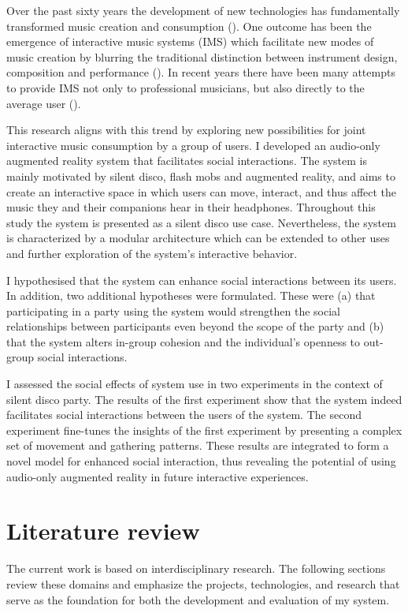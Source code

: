 \documentclass[a4paper,11pt]{article}
\begin{document}
Over the past sixty years the development of new technologies has fundamentally transformed music creation and consumption (\cite{hargreaves99}).
One outcome has been the emergence of interactive music systems (IMS) which facilitate new modes of music creation by blurring the traditional distinction between instrument design, composition and performance (\cite{drummond09}).
In recent years there have been many attempts to provide IMS not only to professional musicians, but also directly to the average user (\cite{stimulant13}).

This research aligns with this trend by exploring new possibilities for joint interactive music consumption by a group of users.
I developed an audio-only augmented reality system that facilitates social interactions.
The system is mainly motivated by silent disco, flash mobs and augmented reality, and aims to create an interactive space in which users can move, interact, and thus affect the music they and their companions hear in their headphones.
Throughout this study the system is presented as a silent disco use case.
Nevertheless, the system is characterized by a modular architecture which can be extended to other uses and further exploration of the system's interactive behavior.

I hypothesised that the system can enhance social interactions between its users.
In addition, two additional hypotheses were formulated.
These were (a) that participating in a party using the system would strengthen the social relationships between participants even beyond the scope of the party and (b) that the system alters in-group cohesion and the individual's openness to out-group social interactions.

I assessed the social effects of system use in two experiments in the context of silent disco party.
The results of the first experiment show that the system indeed facilitates social interactions between the users of the system.
The second experiment fine-tunes the insights of the first experiment by presenting a complex set of movement and gathering patterns.
These results are integrated to form a novel model for enhanced social interaction, thus revealing the potential of using audio-only augmented reality in future interactive experiences.

\clearpage\section{Literature review}

The current work is based on interdisciplinary research.
The following sections review these domains and emphasize the projects, technologies, and research that serve as the foundation for both the development and evaluation of my system.
\end{document}
